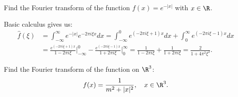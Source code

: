 \documentclass[11pt,letterpaper]{article}
\begin{document}
 
\begin{problem}
    Find the Fourier transform of the function $f(x)=e^{-|x|}$ with $x\in \R$. 
\end{problem}

\begin{solution}
    \quad Basic calculus gives us:
    \begin{align*}
        \hat{f}(\xi) &= \int_{-\infty}^\infty e^{-|x|}e^{-2\pi i \xi x}dx = \int_{-\infty}^0 e^{(-2\pi i \xi +1)x}dx+\int_0^\infty e^{(-2\pi i \xi -1)x}dx\\
        &= \frac{e^{(-2\pi i \xi +1)x}}{1 -2\pi i \xi}\Big\rvert_{-\infty}^0 -\frac{e^{(-2\pi i \xi -1)x}}{1+ 2\pi i \xi}\Big\rvert_0^\infty=\frac{1}{1-2\pi i \xi}+\frac{1}{1+2\pi i \xi} = \frac{2}{1+4\pi^2\xi^2}.
    \end{align*}
\end{solution}

\begin{problem}
    Find the Fourier transform of the function on $\R^3$:
    \[
        f(x) = \frac{1}{m^2+|x|^2}, \quad x\in \R^3
    .\] 
\end{problem}
\end{document}
